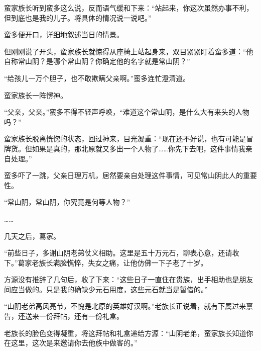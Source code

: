 \begin{this_body}
蛮家族长听到蛮多这么说，反而语气缓和下来：“站起来，你这次虽然办事不利，但到底也是我的儿子。将具体的情况说一说吧。”

蛮多便开口，详细地叙述当日的情景。

但刚刚说了开头，蛮家族长就惊得从座椅上站起身来，双目紧紧盯着蛮多道：“他自称常山阴？是哪个常山阴？你确定他的名字就是常山阴？”

“给孩儿一万个胆子，也不敢欺瞒父亲啊。”蛮多连忙澄清道。

蛮家族长一阵愣神。

“父亲，父亲。”蛮多不得不轻声呼唤，“难道这个常山阴，是什么大有来头的人物吗？”

蛮家族长脱离恍惚的状态，回过神来，目光凝重：“现在还不好说，也有可能是冒牌货。但如果是真的，那北原就又多出一个人物了……你先下去吧，这件事情我亲自处理。”

蛮多吓了一跳，父亲日理万机，居然要亲自处理这件事情，可见常山阴此人的重要性。

“常山阴，常山阴，你究竟是何等人物？”

……

几天之后，葛家。

“前些日子，多谢山阴老弟仗义相助。这里是五十万元石，聊表心意，还请收下。”葛家老族长满脸憔悴，失女之痛，让他仿佛一下子老了十岁。

方源没有推辞了几句后，收了下来：“这些日子一直住在贵族，出手相助也是朋友间应当做的。只是我的确缺少元石用度，这些元石就当是暂借的。”

“山阴老弟高风亮节，不愧是北原的英雄好汉啊。”老族长正说着，就有下属过来禀告，还送来一份拜帖，还有一份礼盒。

老族长的脸色变得凝重，将这拜帖和礼盒递给方源：“山阴老弟，蛮家族长知道你在这里，这次是来邀请你去他族中做客的。”

\end{this_body}

